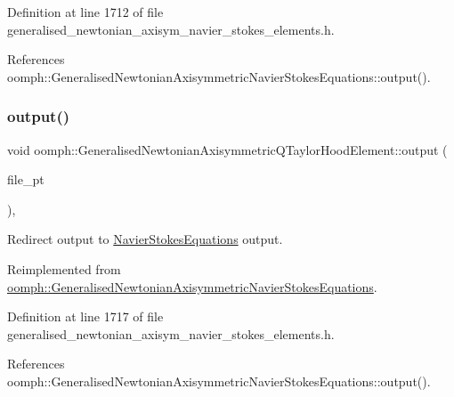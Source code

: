Definition at line 1712 of file generalised\+\_\+newtonian\+\_\+axisym\+\_\+navier\+\_\+stokes\+\_\+elements.\+h.



References oomph\+::\+Generalised\+Newtonian\+Axisymmetric\+Navier\+Stokes\+Equations\+::output().

\mbox{\label{classoomph_1_1GeneralisedNewtonianAxisymmetricQTaylorHoodElement_aa1cdcb0e344c3f3745e9fb9ad0fe3e33}} 
\subsubsection{\texorpdfstring{output()}{output()}\hspace{0.1cm}{\footnotesize\ttfamily [3/4]}}
{\footnotesize\ttfamily void oomph\+::\+Generalised\+Newtonian\+Axisymmetric\+Q\+Taylor\+Hood\+Element\+::output (\begin{DoxyParamCaption}\item[{F\+I\+LE $\ast$}]{file\+\_\+pt }\end{DoxyParamCaption})\hspace{0.3cm}{\ttfamily [inline]}, {\ttfamily [virtual]}}



Redirect output to \hyperlink{classoomph_1_1NavierStokesEquations}{Navier\+Stokes\+Equations} output. 



Reimplemented from \hyperlink{classoomph_1_1GeneralisedNewtonianAxisymmetricNavierStokesEquations_a34a51e3ad73df1ddca173e59a1404c90}{oomph\+::\+Generalised\+Newtonian\+Axisymmetric\+Navier\+Stokes\+Equations}.



Definition at line 1717 of file generalised\+\_\+newtonian\+\_\+axisym\+\_\+navier\+\_\+stokes\+\_\+elements.\+h.



References oomph\+::\+Generalised\+Newtonian\+Axisymmetric\+Navier\+Stokes\+Equations\+::output().

\mbox{\label{classoomph_1_1GeneralisedNewtonianAxisymmetricQTaylorHoodElement_a20ac0d0543f6f277139e526022edd5fd}} 
